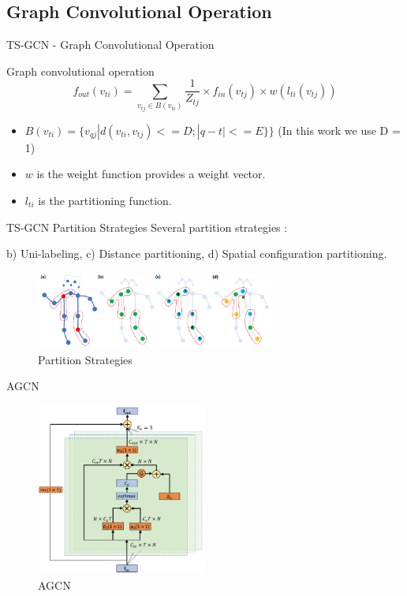 \subsection{Graph Convolutional Operation}
\begin{frame}{TS-GCN - Graph Convolutional Operation}
    \begin{block}{Graph convolutional operation \cite{yan2018spatial}}
        $$f_{out}(v_{ti}) = \sum_{v_{tj} \in B(v_{ti})} \frac{1}{Z_{tj}} \times f_{in}(v_{tj}) \times w(l_{ti}(v_{tj}))$$
        \begin{itemize}
            \item $B(v_{ti}) = \{v_{qj} | d(v_{ti}, v_{tj}) <= D; |q - t| <= E\}\}$ (In this work we use D = 1)
            \item $w$ is the weight function provides a weight vector.
            \item $l_{ti}$ is the partitioning function.
        \end{itemize}
    \end{block}
\end{frame}

\begin{frame}{TS-GCN Partition Strategies}
    Several partition strategies  \cite{yan2018spatial}:

    b) Uni-labeling, c) Distance partitioning, d) Spatial configuration partitioning.
    \begin{figure}[htp]
        \centering
        \includegraphics[width=0.7\textwidth]{topics/201031-yan2018spatial/assets/img/gcn-partition.png}
        \caption{Partition Strategies}
        \label{fig:partition-strategies}
    \end{figure}
\end{frame}


\begin{frame}{AGCN}
    \begin{figure}[htp]
        \centering
        \includegraphics[width=0.5\textwidth]{topics/201031-yan2018spatial/assets/img/agcn.png}
        \caption{AGCN}
        \label{fig:partition-strategies}
    \end{figure}
\end{frame}